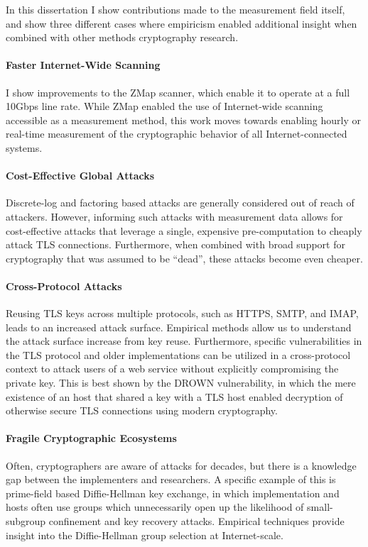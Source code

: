 In this dissertation I show contributions made to the measurement field itself,
and show three different cases where empiricism enabled additional insight when
combined with other methods cryptography research.

\paragraph{Faster Internet-Wide Scanning}
I show improvements to the ZMap scanner, which
enable it to operate at a full 10Gbps line rate. While ZMap enabled the use of
Internet-wide scanning accessible as a measurement method, this work moves
towards enabling hourly or real-time measurement of the cryptographic behavior
of all Internet-connected systems.

\paragraph{Cost-Effective Global Attacks}
Discrete-log and factoring based attacks are generally considered out of reach
of attackers.  However, informing such attacks with measurement data allows for
cost-effective attacks that leverage a single, expensive pre-computation to
cheaply attack TLS connections. Furthermore, when combined with broad support
for cryptography that was assumed to be “dead”, these attacks become even
cheaper.

\paragraph{Cross-Protocol Attacks}
Reusing TLS keys across multiple protocols, such as HTTPS, SMTP, and IMAP,
leads to an increased attack surface. Empirical methods allow us to understand
the attack surface increase from key reuse. Furthermore, specific
vulnerabilities in the TLS protocol and older implementations can be utilized
in a cross-protocol context to attack users of a web service without explicitly
compromising the private key. This is best shown by the DROWN vulnerability, in
which the mere existence of an \ssltwo host that shared a key with a TLS host
enabled decryption of otherwise secure TLS connections using modern
cryptography.

\paragraph{Fragile Cryptographic Ecosystems}
Often, cryptographers are aware of attacks for decades, but there is a
knowledge gap between the implementers and researchers. A specific example of
this is prime-field based Diffie-Hellman key exchange, in which implementation
and hosts often use groups which unnecessarily open up the likelihood of
small-subgroup confinement and key recovery attacks. Empirical techniques
provide insight into the Diffie-Hellman group selection at Internet-scale.


